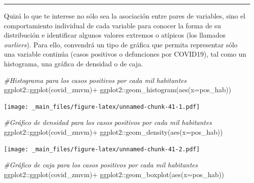 \documentclass[
  11pt,
  oneside]{book}
\newenvironment{Shaded}{\begin{snugshade}}{\end{snugshade}}
\newcommand{\AttributeTok}[1]{\textcolor[rgb]{0.77,0.63,0.00}{#1}}
\newcommand{\CommentTok}[1]{\textcolor[rgb]{0.56,0.35,0.01}{\textit{#1}}}
\newcommand{\FunctionTok}[1]{\textcolor[rgb]{0.00,0.00,0.00}{#1}}
\newcommand{\NormalTok}[1]{#1}
\newcommand{\SpecialCharTok}[1]{\textcolor[rgb]{0.00,0.00,0.00}{#1}}
\begin{document}
\begin{center}\rule{0.5\linewidth}{0.5pt}\end{center}

Quizá lo que te interese no sólo sea la asociación entre pares de variables, sino el comportamiento individual de cada variable para conocer la forma de su distribución e identificar algunos valores extremos o atípicos (los llamados \emph{ourliers}). Para ello, convendrá un tipo de gráfica que permita representar sólo una variable continúa (casos positivos o defunciones por COVID19), tal como un histograma, una gráfica de densidad o de caja.

\begin{Shaded}
\begin{Highlighting}[]
\CommentTok{\#Histograma para los casos positivos por cada mil habitantes}
\NormalTok{ggplot2}\SpecialCharTok{::}\FunctionTok{ggplot}\NormalTok{(covid\_zmvm)}\SpecialCharTok{+}
\NormalTok{  ggplot2}\SpecialCharTok{::}\FunctionTok{geom\_histogram}\NormalTok{(}\FunctionTok{aes}\NormalTok{(}\AttributeTok{x=}\NormalTok{pos\_hab))}
\end{Highlighting}
\end{Shaded}

\texttt{[image: \_main\_files/figure-latex/unnamed-chunk-41-1.pdf]}

\begin{Shaded}
\begin{Highlighting}[]
\CommentTok{\#Gráfico de densidad para los casos positivos por cada mil habitantes}
\NormalTok{ggplot2}\SpecialCharTok{::}\FunctionTok{ggplot}\NormalTok{(covid\_zmvm)}\SpecialCharTok{+}
\NormalTok{  ggplot2}\SpecialCharTok{::}\FunctionTok{geom\_density}\NormalTok{(}\FunctionTok{aes}\NormalTok{(}\AttributeTok{x=}\NormalTok{pos\_hab))}
\end{Highlighting}
\end{Shaded}

\texttt{[image: \_main\_files/figure-latex/unnamed-chunk-41-2.pdf]}

\begin{Shaded}
\begin{Highlighting}[]
\CommentTok{\#Gráfico de caja para los casos positivos por cada mil habitantes}
\NormalTok{ggplot2}\SpecialCharTok{::}\FunctionTok{ggplot}\NormalTok{(covid\_zmvm)}\SpecialCharTok{+}
\NormalTok{  ggplot2}\SpecialCharTok{::}\FunctionTok{geom\_boxplot}\NormalTok{(}\FunctionTok{aes}\NormalTok{(}\AttributeTok{x=}\NormalTok{pos\_hab))}
\end{Highlighting}
\end{Shaded}
\end{document}
